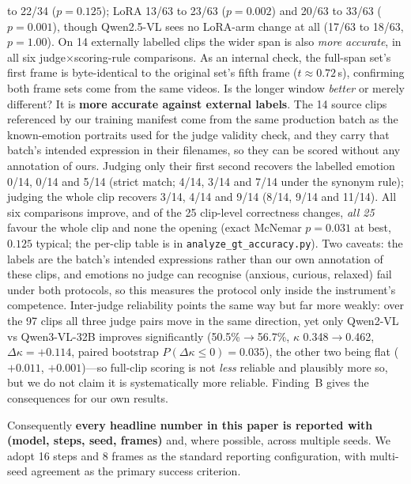 \documentclass[10pt,twocolumn]{article}
\begin{document}
\begin{itemize}
to 22/34 ($p{=}0.125$); LoRA 13/63 to 23/63 ($p{=}0.002$) and 20/63 to 33/63 ($p{=}0.001$), though
Qwen2.5-VL sees no LoRA-arm change at all (17/63 to 18/63, $p{=}1.00$). On 14 externally labelled clips the
wider span is also \emph{more accurate}, in all six judge$\times$scoring-rule comparisons. As an internal check, the full-span set's
first frame is byte-identical to the original set's fifth frame ($t\approx0.72$\,s), confirming both
frame sets come from the same videos. Is the longer window \emph{better} or merely different? It is
\textbf{more accurate against external labels}. The 14 source clips referenced by our training manifest
come from the same production batch as the known-emotion portraits used for the judge validity check, and
they carry that batch's intended expression in their filenames, so they can be scored without any
annotation of ours. Judging only their first second recovers the labelled emotion 0/14, 0/14 and 5/14
(strict match; 4/14, 3/14 and 7/14 under the synonym rule); judging the whole clip recovers 3/14, 4/14 and
9/14 (8/14, 9/14 and 11/14). All six comparisons improve, and of the 25 clip-level correctness changes,
\emph{all 25} favour the whole clip and none the opening (exact McNemar $p{=}0.031$ at best, $0.125$
typical; the per-clip table is in \texttt{analyze\_gt\_accuracy.py}). Two caveats: the labels are the
batch's intended expressions rather than our own annotation of these clips, and emotions no judge can
recognise (anxious, curious, relaxed) fail under both protocols, so this measures the protocol only inside
the instrument's competence. Inter-judge reliability points the same way but far more weakly: over the 97
clips all three judge pairs move in the same direction, yet only Qwen2-VL vs Qwen3-VL-32B improves
significantly (50.5\%$\rightarrow$56.7\%, $\kappa$ 0.348$\rightarrow$0.462,
$\Delta\kappa{=}{+}0.114$, paired bootstrap $P(\Delta\kappa{\le}0){=}0.035$), the other two being flat
($+0.011$, $+0.001$)---so full-clip scoring is not \emph{less} reliable and plausibly more so, but we do
not claim it is systematically more reliable. Finding~B gives the consequences for our own
results.
\end{itemize}
Consequently \textbf{every headline number in this paper is reported with (model, steps, seed,
frames)} and, where possible, across multiple seeds. We adopt 16 steps and 8 frames as the
standard reporting configuration, with multi-seed agreement as the primary success criterion.
\end{document}
